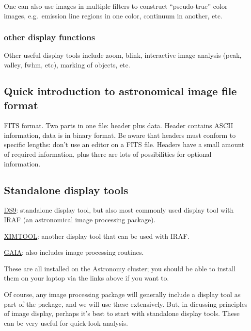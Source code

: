 \documentclass{article}
\begin{document}
One can also use images in multiple filters to construct
``pseudo-true'' color images, e.g.\ emission line regions in one color,
continuum in another, etc.

\subsubsection*{other display functions}
Other useful display tools include zoom, blink, interactive image
analysis (peak, valley, fwhm, etc), marking of objects, etc.

\subsection*{Quick introduction to astronomical image file format}
FITS format. Two parts in one file: header plus data. Header contains
ASCII information, data is in binary format. Be aware that headers must
conform to specific lengths: don't use an editor on a FITS file.
Headers have a small amount of required information, plus there are
lots of possibilities for optional information.

\subsection*{Standalone display tools}
\begin{itemize*}
    \item \href{http://ds9.si.edu/site/Home.html}
        {DS9}: standalone display tool, but also most commonly used
        display tool with IRAF (an astronomical image processing
        package).
    \item \href{http://iraf.noao.edu/x11iraf/x11iraf.html}
        {XIMTOOL}: another display tool that can be used with IRAF.
    \item \href{http://starlink.eao.hawaii.edu/starlink/}
        {GAIA}: also includes image processing routines.
\end{itemize*}
These are all installed on the Astronomy cluster; you should be able to
install them on your laptop via the links above if you want to.

Of course, any image processing package will generally include a
display tool as part of the package, and we will use these
extensively. But, in dicussing principles of image display, perhaps
it's best to start with standalone display tools. These can be very
useful for quick-look analysis.
\end{document}
